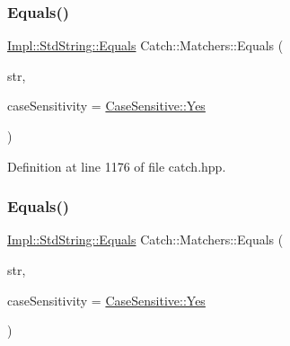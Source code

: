 \subsubsection{\texorpdfstring{Equals()}{Equals()}\hspace{0.1cm}{\footnotesize\ttfamily [1/2]}}
{\footnotesize\ttfamily \hyperlink{struct_catch_1_1_matchers_1_1_impl_1_1_std_string_1_1_equals}{Impl\+::\+Std\+String\+::\+Equals} Catch\+::\+Matchers\+::\+Equals (\begin{DoxyParamCaption}\item[{std\+::string const \&}]{str,  }\item[{\hyperlink{struct_catch_1_1_case_sensitive_aad49d3aee2d97066642fffa919685c6a}{Case\+Sensitive\+::\+Choice}}]{case\+Sensitivity = {\ttfamily \hyperlink{struct_catch_1_1_case_sensitive_aad49d3aee2d97066642fffa919685c6aa7c5550b69ec3c502e6f609b67f9613c6}{Case\+Sensitive\+::\+Yes}} }\end{DoxyParamCaption})\hspace{0.3cm}{\ttfamily [inline]}}



Definition at line 1176 of file catch.\+hpp.

\hypertarget{namespace_catch_1_1_matchers_a7454444261cc4af7ee0b0bc82cf74284}{}\label{namespace_catch_1_1_matchers_a7454444261cc4af7ee0b0bc82cf74284} 
\subsubsection{\texorpdfstring{Equals()}{Equals()}\hspace{0.1cm}{\footnotesize\ttfamily [2/2]}}
{\footnotesize\ttfamily \hyperlink{struct_catch_1_1_matchers_1_1_impl_1_1_std_string_1_1_equals}{Impl\+::\+Std\+String\+::\+Equals} Catch\+::\+Matchers\+::\+Equals (\begin{DoxyParamCaption}\item[{const char $\ast$}]{str,  }\item[{\hyperlink{struct_catch_1_1_case_sensitive_aad49d3aee2d97066642fffa919685c6a}{Case\+Sensitive\+::\+Choice}}]{case\+Sensitivity = {\ttfamily \hyperlink{struct_catch_1_1_case_sensitive_aad49d3aee2d97066642fffa919685c6aa7c5550b69ec3c502e6f609b67f9613c6}{Case\+Sensitive\+::\+Yes}} }\end{DoxyParamCaption})\hspace{0.3cm}{\ttfamily [inline]}}



